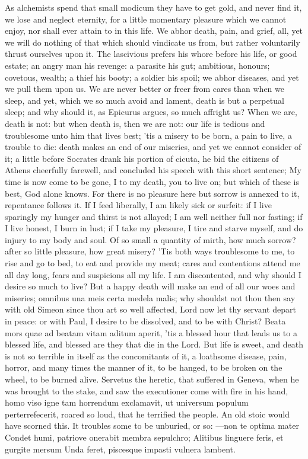 {As alchemists spend that small modicum they have to get gold, and never
find it, we lose and neglect eternity, for a little momentary pleasure
which we cannot enjoy, nor shall ever attain to in this life. We abhor
death, pain, and grief, all, yet we will do nothing of that which
should vindicate us from, but rather voluntarily thrust ourselves upon
it.  The lascivious prefers his whore before his life, or good
estate; an angry man his revenge: a parasite his gut; ambitious,
honours; covetous, wealth; a thief his booty; a soldier his spoil; we
abhor diseases, and yet we pull them upon us. We are never better or
freer from cares than when we sleep, and yet, which we so much avoid
and lament, death is but a perpetual sleep; and why should it, as
Epicurus argues, so much affright us? When we are, death is not:
but when death is, then we are not: our life is tedious and troublesome
unto him that lives best; 'tis a misery to be born, a pain to
live, a trouble to die: death makes an end of our miseries, and yet we
cannot consider of it; a little before Socrates drank his portion
of cicuta, he bid the citizens of Athens cheerfully farewell, and
concluded his speech with this short sentence; My time is now come to
be gone, I to my death, you to live on; but which of these is best, God
alone knows. For there is no pleasure here but sorrow is annexed to it,
repentance follows it. If I feed liberally, I am likely sick or
surfeit: if I live sparingly my hunger and thirst is not allayed; I am
well neither full nor fasting; if I live honest, I burn in lust; if I
take my pleasure, I tire and starve myself, and do injury to my body
and soul. Of so small a quantity of mirth, how much sorrow? after
so little pleasure, how great misery? 'Tis both ways troublesome to me,
to rise and go to bed, to eat and provide my meat; cares and
contentions attend me all day long, fears and suspicions all my life. I
am discontented, and why should I desire so much to live? But a happy
death will make an end of all our woes and miseries; omnibus una meis
certa medela malis; why shouldst not thou then say with old Simeon
since thou art so well affected, Lord now let thy servant depart in
peace: or with Paul, I desire to be dissolved, and to be with Christ?
Beata mors quae ad beatam vitam aditum aperit, 'tis a blessed hour that
leads us to a blessed life, and blessed are they that die in the
Lord. But life is sweet, and death is not so terrible in itself as the
concomitants of it, a loathsome disease, pain, horror, \etc{} and many
times the manner of it, to be hanged, to be broken on the wheel, to be
burned alive. Servetus the heretic, that suffered in Geneva, when
he was brought to the stake, and saw the executioner come with fire in
his hand, homo viso igne tam horrendum exclamavit, ut universum populum
perterrefecerit, roared so loud, that he terrified the people. An old
stoic would have scorned this. It troubles some to be unburied, or so:
---non te optima mater
Condet humi, patriove onerabit membra sepulchro;
Alitibus linguere feris, et gurgite mersum
Unda feret, piscesque impasti vulnera lambent.

}

